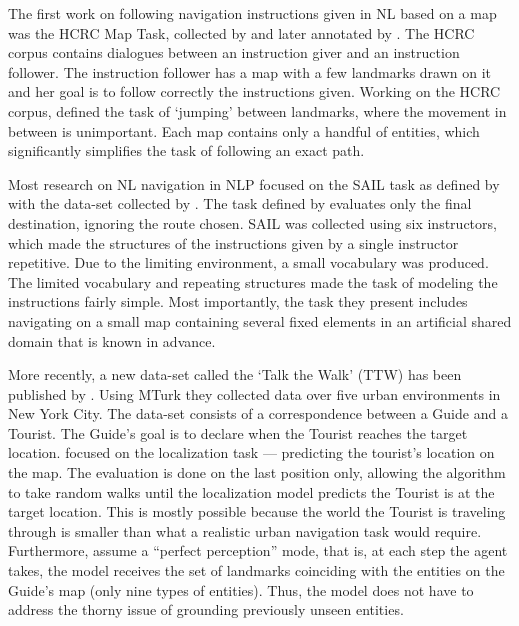 \documentclass[11pt,a4paper]{article}
\begin{document}
The first work on following navigation instructions given in NL based on a map was the HCRC Map Task, collected by \citet{anderson1991hcrc} and later annotated by \citet{levit2007interpretation}. The HCRC   corpus  contains dialogues between an instruction giver and an instruction follower. The instruction follower has a map with a few landmarks drawn on it and her goal is to follow correctly the instructions given. Working on the HCRC corpus, \citet{vogel2010learning} defined the task of \enquote*{jumping} between landmarks, where the movement in between is unimportant. Each map contains only a handful of entities, which  significantly simplifies  the task of following an exact path.  


Most research on NL navigation in NLP \citep{macmahon2006walk,chen2011learning,kim2012unsupervised,kim2013adapting,artzi2013weakly,artzi2014learning,mei2015listen,fried2017unified,andreas2015alignment}  focused on the SAIL task as defined by \citet{chen2011learning} with the data-set collected by \citet{macmahon2006walk}. The task defined by \citet{chen2011learning} evaluates only the final destination, ignoring the route chosen. SAIL was collected using  six instructors, which made the structures of the instructions given by a single instructor repetitive. Due to the limiting environment, a small vocabulary was produced. The limited vocabulary and repeating structures made the task of modeling the instructions fairly simple. Most importantly, the task they present includes navigating on a small map containing several fixed elements in an artificial shared domain that is known in advance.  

More recently,  a new data-set called the \enquote*{Talk the Walk} (TTW) has been published by \citet{de2018talk}. Using MTurk they collected data over five urban environments in New York City. The data-set consists of a correspondence between a Guide and a Tourist. The Guide's goal is to declare when the Tourist reaches the target location. \citet{de2018talk} focused on the localization task --- predicting the tourist's location on the map. The evaluation is done on the last position only, allowing the algorithm to take random walks until the localization model predicts the Tourist is at the target location. 
This is mostly possible because the world the Tourist is traveling through is smaller than what a realistic urban navigation task would require. Furthermore, \citet{de2018talk} assume a \enquote{perfect perception} mode, that is, at each step the agent takes, the model receives the set of  landmarks coinciding with the entities on the Guide's map (only nine types of entities). Thus, the model does not have to address the thorny issue of grounding previously unseen entities.
 
\end{document}
